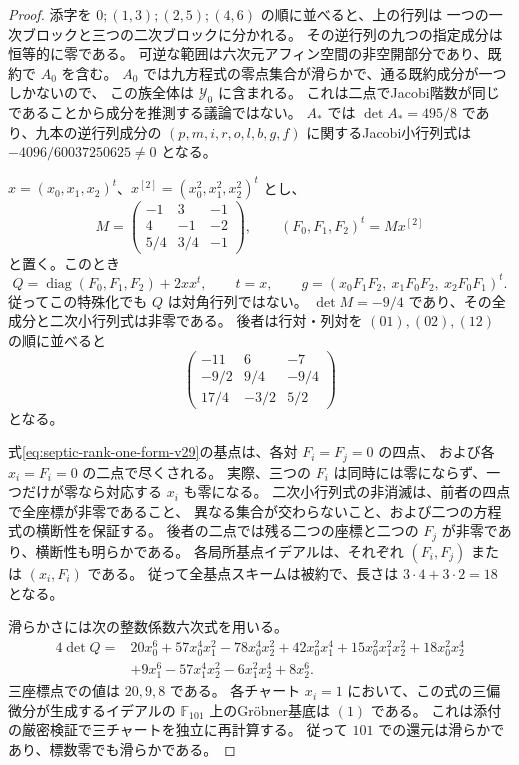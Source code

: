 \begin{proof}
添字を $0;(1,3);(2,5);(4,6)$ の順に並べると、上の行列は
一つの一次ブロックと三つの二次ブロックに分かれる。
その逆行列の九つの指定成分は恒等的に零である。
可逆な範囲は六次元アフィン空間の非空開部分であり、既約で $A_0$ を含む。
$A_0$ では九方程式の零点集合が滑らかで、通る既約成分が一つしかないので、
この族全体は $\mathcal Y_0$ に含まれる。
これは二点でJacobi階数が同じであることから成分を推測する議論ではない。
$A_*$ では $\det A_*=495/8$ であり、九本の逆行列成分の
$(p,m,i,r,o,l,b,g,f)$ に関するJacobi小行列式は
$-4096/60037250625\ne0$ となる。

$x=(x_0,x_1,x_2)^t$、$x^{[2]}=(x_0^2,x_1^2,x_2^2)^t$ とし、
\begin{equation}\label{eq:septic-Mstar-v29}
 M=\begin{pmatrix}-1&3&-1\\4&-1&-2\\5/4&3/4&-1\end{pmatrix},
 \qquad (F_0,F_1,F_2)^t=Mx^{[2]}
\end{equation}
と置く。このとき
\begin{equation}\label{eq:septic-rank-one-form-v29}
 Q=\operatorname{diag}(F_0,F_1,F_2)+2xx^t,\qquad t=x,
 \qquad
 g=(x_0F_1F_2,\ x_1F_0F_2,\ x_2F_0F_1)^t.
\end{equation}
従ってこの特殊化でも $Q$ は対角行列ではない。
$\det M=-9/4$ であり、その全成分と二次小行列式は非零である。
後者は行対・列対を $(01),(02),(12)$ の順に並べると
\[
 \begin{pmatrix}
 -11&6&-7\\ -9/2&9/4&-9/4\\17/4&-3/2&5/2
 \end{pmatrix}
\]
となる。

式\eqref{eq:septic-rank-one-form-v29}の基点は、各対 $F_i=F_j=0$ の四点、
および各 $x_i=F_i=0$ の二点で尽くされる。
実際、三つの $F_i$ は同時には零にならず、一つだけが零なら対応する $x_i$ も零になる。
二次小行列式の非消滅は、前者の四点で全座標が非零であること、
異なる集合が交わらないこと、および二つの方程式の横断性を保証する。
後者の二点では残る二つの座標と二つの $F_j$ が非零であり、横断性も明らかである。
各局所基点イデアルは、それぞれ $(F_i,F_j)$ または $(x_i,F_i)$ である。
従って全基点スキームは被約で、長さは $3\cdot4+3\cdot2=18$ となる。

滑らかさには次の整数係数六次式を用いる。
\begin{align*}
 4\det Q={}&20x_0^6+57x_0^4x_1^2-78x_0^4x_2^2
 +42x_0^2x_1^4+15x_0^2x_1^2x_2^2+18x_0^2x_2^4\\
 &+9x_1^6-57x_1^4x_2^2-6x_1^2x_2^4+8x_2^6.
\end{align*}
三座標点での値は $20,9,8$ である。
各チャート $x_i=1$ において、この式の三偏微分が生成するイデアルの
$\mathbb F_{101}$ 上のGr\"obner基底は $(1)$ である。
これは添付の厳密検証で三チャートを独立に再計算する。
従って $101$ での還元は滑らかであり、標数零でも滑らかである。
\end{proof}

